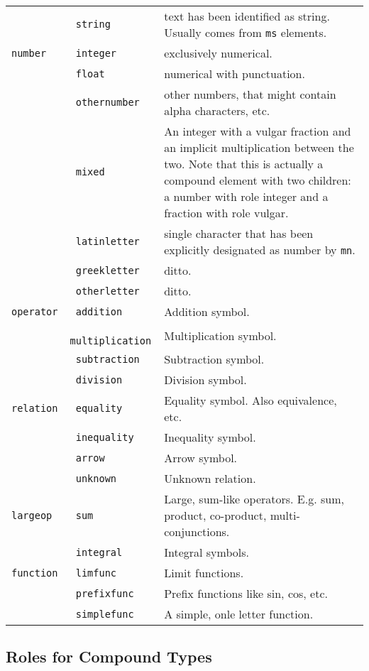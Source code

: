 \documentclass{article}
\def\mathml#1{\texttt{#1}}
\begin{document}
\begin{tabular}{>{\tt}l>{\tt}lp{11cm}}
              & string & text has been identified as string. Usually comes from \mathml{ms} elements.\\
  number & integer & exclusively numerical.\\
              & float & numerical with punctuation.\\
              & othernumber & other numbers, that might contain alpha characters, etc.\\
              & mixed & An integer with a vulgar fraction and an implicit multiplication between the two.
                        Note that this is actually a compound element with two children: a number 
                        with role integer and a fraction with role vulgar.\\
              & latinletter & single character that has been explicitly designated as number by \mathml{mn}.\\
              & greekletter & ditto.\\
              & otherletter & ditto. \\
  operator    & addition & Addition symbol.\\
              & multiplication & Multiplication symbol.\\
              & subtraction & Subtraction symbol.\\
              & division & Division symbol.\\
  relation    & equality & Equality symbol. Also equivalence, etc.\\
              & inequality & Inequality symbol.\\
              & arrow & Arrow symbol.\\
              & unknown & Unknown relation.\\
  largeop & sum & Large, sum-like operators. E.g. sum, product, co-product, multi-conjunctions.\\
              & integral & Integral symbols.\\
  function & limfunc & Limit functions.\\
              & prefixfunc & Prefix functions like sin, cos, etc.\\
              & simplefunc & A simple, onle letter function.\\
\end{tabular}


\subsection{Roles for Compound Types}
\end{document}
